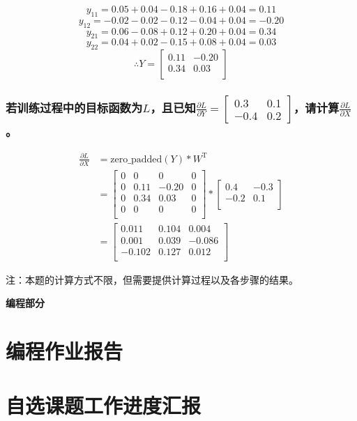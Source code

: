 \documentclass[a4paper]{article}
\begin{document}
\[y_{11} = 0.05 + 0.04 - 0.18 + 0.16 + 0.04 = 0.11\]
\[y_{12} = -0.02 - 0.02 - 0.12 - 0.04 + 0.04 = -0.20\]
\[y_{21} = 0.06 - 0.08 + 0.12 + 0.20 + 0.04 = 0.34\]
\[y_{22} = 0.04 + 0.02 - 0.15 + 0.08 + 0.04 = 0.03\]
\[\therefore Y = \begin{bmatrix}
                0.11 & -0.20 \\
                0.34 & 0.03 \\
                \end{bmatrix}\]

\subsubsection{若训练过程中的目标函数为$L$，且已知$\frac{\partial L}{\partial Y}=\left[ \begin{array}{cc}
    0.3 & 0.1 \\
    -0.4 & 0.2
\end{array} \right]$，请计算$\frac{\partial L}{\partial X}$。
}
\begin{align*}
    \frac{\partial L}{\partial X} &= \mathrm{zero\_padded}(Y) * W^{\mathrm{T}} \\
    &= \begin{bmatrix}
        0 & 0 & 0 & 0 \\
        0 & 0.11 & -0.20 & 0 \\
        0 & 0.34 & 0.03 & 0 \\
        0 & 0 & 0 & 0 \\
    \end{bmatrix} *
    \begin{bmatrix}
        0.4 & -0.3 \\
        -0.2 & 0.1 \\
    \end{bmatrix} \\
    &= \begin{bmatrix}
        0.011 & 0.104 & 0.004 \\
        0.001 & 0.039 & -0.086 \\
        -0.102 & 0.127 &0.012 \\
    \end{bmatrix}
\end{align*}

注：本题的计算方式不限，但需要提供计算过程以及各步骤的结果。
\vspace{6mm}

\centerline{\textbf{\Large{编程部分}}}
\vspace{3mm}

\section{编程作业报告}
\section{自选课题工作进度汇报}
\end{document}
